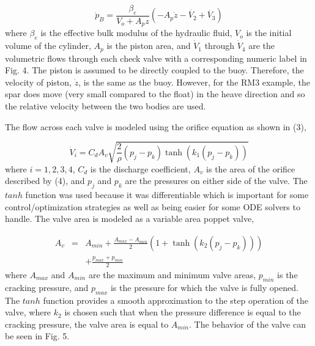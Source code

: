 \documentclass[conference]{IEEEtran}
\begin{document}
\begin{equation}
\dot{p}_B=\frac{\beta_e}{V_o+A_pz}(-A_p\dot{z}-\dot{V_2}+\dot{V_3}) 
\end{equation}
%
where $\beta_e$ is the effective bulk modulus of the hydraulic fluid, $V_o$ is the initial volume of the cylinder, $A_p$ is the piston area, and $\dot{V}_1$ through $\dot{V}_4$ are the volumetric flows through each check valve with a corresponding numeric label in Fig. 4. The piston is assumed to be directly coupled to the buoy. Therefore, the velocity of piston, $\dot{z}$, is the same as the buoy. However, for the RM3 example, the spar does move (very small compared to the float) in the heave direction and so the relative velocity between the two bodies are used. 

The flow across each valve is modeled using the orifice equation as shown in (3), 

\begin{equation}
\dot{V}_i=C_dA_v \sqrt{\frac{2}{\rho}(p_j-p_k)\tanh(k_1(p_j-p_k))}  
\end{equation}
%
where $i=1,2,3,4$, $C_d$ is the discharge coefficient, $A_v$ is the area of the orifice described by (4), and $p_j$ and $p_k$  are the pressures on either side of the valve. The $tanh$ function was used because it was differentiable which is important for some control/optimization strategies as well as being easier for some ODE solvers to handle. The valve area is modeled as a variable area poppet valve,  

\begin{eqnarray}
A_v &=& A_{min}+\frac{A_{max}-A_{min}}{2}(1+\tanh(k_2(p_j-p_k)))\nonumber\\
&& +\frac{p_{max}+p_{min}}{2}
\end{eqnarray}
%
where $A_{max}$ and  $A_{min}$ are the maximum and minimum valve areas, $p_{min}$ is the cracking pressure, and $p_{max}$ is the pressure for which the valve is fully opened.  The $tanh$ function provides a smooth approximation to the step operation of the valve, where $k_2$ is chosen such that when the pressure difference is equal to the cracking pressure, the valve area is equal to $A_{min}$. The behavior of the valve can be seen in Fig. 5. 
\end{document}
